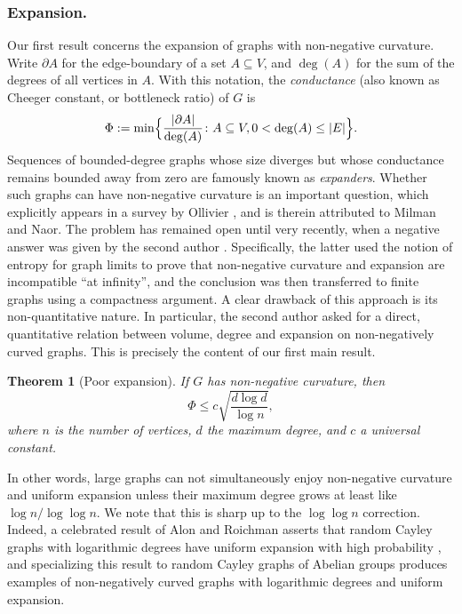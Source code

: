 \documentclass[10pt]{amsart}
\newtheorem{theorem}{Theorem}
\theoremstyle{definition}
\begin{document}
\subsubsection*{Expansion.} Our first result concerns the expansion of graphs with non-negative curvature. Write $\partial A$ for the edge-boundary of a set $A\subseteq V$, and $\deg(A)$ for the sum of the degrees of all vertices in $A$. With this notation, the \emph{conductance} (also known as Cheeger constant, or bottleneck ratio) of $G$ is
\begin{equation*}
\Phi := \min\Bigl\{\frac{|\partial A|}{\deg(A)}\colon A\subseteq V,0<\deg(A)\le |E|\Bigr\}.
\end{equation*}
Sequences of bounded-degree graphs whose size diverges but whose conductance remains bounded away from zero are famously known as \emph{expanders}. Whether such graphs can have non-negative curvature is an important question, which explicitly appears in a survey by Ollivier \cite[Probl.\,T]{ollivier2010survey}, and is therein attributed to Milman and Naor. The problem has remained open until very recently, when a negative answer was given by the second author \cite{salez2021sparse}. Specifically, the latter used the notion of entropy for graph limits to prove that non-negative curvature and expansion are incompatible “at infinity”, and the conclusion was then transferred to finite graphs using a compactness argument. A clear drawback of this approach is its non-quantitative nature. In particular, the second author asked for a direct, quantitative relation between volume, degree and expansion on non-negatively curved graphs. This is precisely the content of our first main result.
\begin{theorem}[Poor expansion]\label{th:nonexp}If $G$ has non-negative curvature, then
\begin{equation*}
\Phi \le c\sqrt{\frac{d\log d}{\log n}},
\end{equation*}
where $n$ is the number of vertices, $d$ the maximum degree, and $c$ a universal constant.
\end{theorem}
In other words, large graphs can not simultaneously enjoy non-negative curvature and uniform expansion unless their maximum degree grows at least like $\log n/\log\log n$. We note that this is sharp up to the $\log\log n$ correction. Indeed, a celebrated result of Alon and Roichman asserts that random Cayley graphs with logarithmic degrees have uniform expansion with high probability \cite{MR1262979}, and specializing this result to random Cayley graphs of Abelian groups produces examples of non-negatively curved graphs with logarithmic degrees and uniform expansion.
\end{document}
